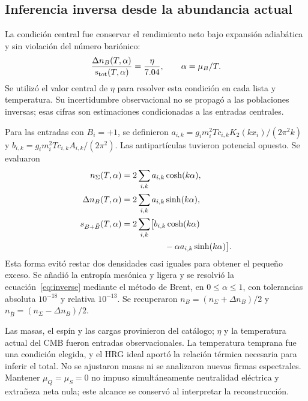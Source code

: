 \subsection{Inferencia inversa desde la abundancia actual}
La condición central fue conservar el rendimiento neto bajo expansión adiabática y sin violación del número bariónico:
\begin{equation}
\frac{\Delta n_B(T,\alpha)}{s_{\mathrm{tot}}(T,\alpha)}
=\frac{\eta}{7.04},\qquad \alpha=\mu_B/T.
\label{eq:inverse}
\end{equation}
Se utilizó el valor central de $\eta$ para resolver esta condición en cada lista y temperatura. Su incertidumbre observacional no se propagó a las poblaciones inversas; esas cifras son estimaciones condicionadas a las entradas centrales.

Para las entradas con $B_i=+1$, se definieron $a_{i,k}=g_i m_i^2T c_{i,k}K_2(kx_i)/(2\pi^2 k)$ y $b_{i,k}=g_i m_i^2T c_{i,k}A_{i,k}/(2\pi^2)$. Las antipartículas tuvieron potencial opuesto. Se evaluaron
\begin{align}
n_\Sigma(T,\alpha)&=2\sum_{i,k}a_{i,k}\cosh(k\alpha),\\
\Delta n_B(T,\alpha)&=2\sum_{i,k}a_{i,k}\sinh(k\alpha),\\
\sB(T,\alpha)&=2\sum_{i,k}\bigl[b_{i,k}\cosh(k\alpha)\nonumber\\
&\hspace{18mm}-\alpha a_{i,k}\sinh(k\alpha)\bigr].
\label{eq:inversekernels}
\end{align}
Esta forma evitó restar dos densidades casi iguales para obtener el pequeño exceso. Se añadió la entropía mesónica y ligera y se resolvió la ecuación~\eqref{eq:inverse} mediante el método de Brent, en $0\leq\alpha\leq1$, con tolerancias absoluta $10^{-18}$ y relativa $10^{-13}$. Se recuperaron $n_B=(n_\Sigma+\Delta n_B)/2$ y $n_{\bar B}=(n_\Sigma-\Delta n_B)/2$.

Las masas, el espín y las cargas provinieron del catálogo; $\eta$ y la temperatura actual del CMB fueron entradas observacionales. La temperatura temprana fue una condición elegida, y el HRG ideal aportó la relación térmica necesaria para inferir el total. No se ajustaron masas ni se analizaron nuevas firmas espectrales. Mantener $\mu_Q=\mu_S=0$ no impuso simultáneamente neutralidad eléctrica y extrañeza neta nula; este alcance se conservó al interpretar la reconstrucción.

